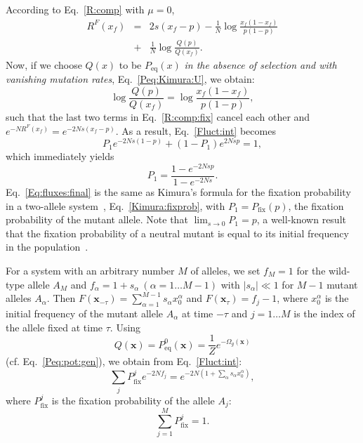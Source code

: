 \documentclass[9pt,twocolumn,twoside]{gsajnl}
\begin{document}
According to Eq.~\eqref{R:comp} with $\mu = 0$,
\begin{eqnarray} \label{R:comp:fix}
R^{F} (x_f) &=& 2 s (x_f - p) - \frac{1}{N} \log \frac{x_f (1 - x_f)}{p (1 - p)} \nonumber \\
&+& \frac{1}{N} \log \frac{Q(p)}{Q(x_f)}.
\end{eqnarray}
Now, if we choose $Q(x)$ to be $P_\text{eq} (x)$ \emph{in the absence of selection and with vanishing mutation rates}, Eq.~\eqref{Peq:Kimura:U}, we obtain:
\begin{equation} \label{R:comp:aux1}
\log \frac{Q(p)}{Q(x_f)} = \log \frac{x_f (1 - x_f)}{p (1 - p)},
\end{equation}
such that the last two terms in Eq.~\eqref{R:comp:fix} cancel each other and $e^{-N R^{F} (x_f)} = e^{-2Ns (x_f - p)}$. As a result, Eq.~\eqref{Fluct:int} becomes
\begin{equation} \label{Eq:fluxes}
P_1 e^{-2Ns (1-p)} + (1 - P_1) e^{2Ns p} = 1,
\end{equation}
which immediately yields
\begin{equation} \label{Eq:fluxes:final}
P_1 = \frac{1 - e^{-2Nsp}}{1 - e^{-2Ns}}.
\end{equation}
Eq.~\eqref{Eq:fluxes:final} is the same as Kimura's formula for the fixation probability in a two-allele system~\citep{Kimura1962}, Eq.~\eqref{Kimura:fixprob},
with $P_1 = P_\text{fix} (p)$, the fixation probability of the mutant allele. Note that $\lim_{s \to 0} P_1 = p$, a well-known result that the fixation probability
of a neutral mutant is equal to its initial frequency in the population~\citep{Gillespie2004}.

For a system with an arbitrary number $M$ of alleles, we set $f_M = 1$ for the wild-type allele $A_M$ and $f_\alpha = 1 + s_\alpha~(\alpha = 1 \dots M-1)$ with $|s_\alpha| \ll 1$
for $M-1$ mutant alleles $A_\alpha$. Then $F(\mathbf{x}_{-\tau}) = \sum_{\alpha=1}^{M-1} s_\alpha x^{\alpha}_{0}$ and $F(\mathbf{x}_{\tau}) = f_j - 1$, where $x^{\alpha}_{0}$ is the initial frequency of the mutant
allele $A_\alpha$ at time $-\tau$ and $j = 1 \dots M$ is the index of the allele fixed at time $\tau$.
Using
\begin{equation} \label{Peq:nomut}
Q (\mathbf{x}) = P_\text{eq}^0 (\mathbf{x}) = \frac{1}{Z} e^{-\Omega_g (\mathbf{x})}
\end{equation}
(cf. Eq.~\eqref{Peq:pot:gen}), we obtain from Eq.~\eqref{Fluct:int}:
\begin{equation} \label{Eq:fluxes:final:M}
\sum_{j} P_{\text{fix}}^{j} e^{-2 N f_j} = e^{-2N (1 + \sum_{\alpha} s_\alpha x^{\alpha}_{0})},
\end{equation}
where $P_{\text{fix}}^{j}$ is the fixation probability of the allele $A_j$:
\begin{equation} \label{Eq:Pfix:norm}
\sum_{j=1}^M P_{\text{fix}}^{j} = 1.
\end{equation}
\end{document}
